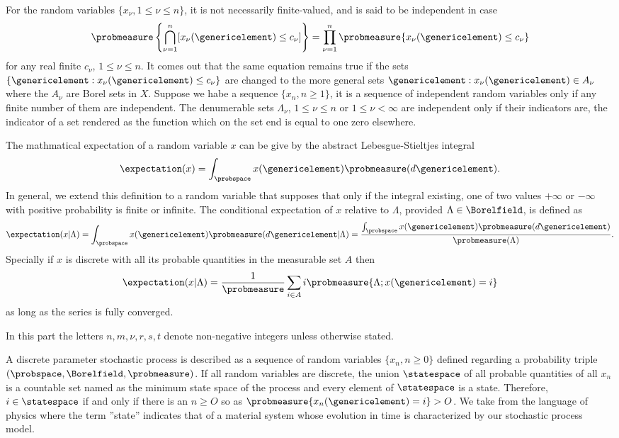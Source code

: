 For the random variables $\{x_\nu, 1\leq \nu \leq n\}$, it is not necessarily finite-valued, and is said to be independent in case
\begin{equation}
\probmeasure \left\{\bigcap_{\nu=1}^n [x_\nu(\genericelement)\leq c_\nu]\right\} = \prod_{\nu =1}^n \probmeasure\{x_\nu (\genericelement)\leq c_\nu\}
\end{equation}
for any real finite $c_\nu$, $1\leq \nu \leq n$. It comes out that the same equation remains true if the sets $\{\genericelement :x_\nu (\genericelement)\leq c_\nu\}$ are changed to the more general sets ${\genericelement :x_\nu(\genericelement)\in A_\nu}$ where the $A_\nu$ are Borel sets in $X$. Suppose we habe a sequence $\{x_n,n\geq 1\}$, it is a sequence of independent random variables only if any finite number of them are independent. The denumerable sets $\Lambda_\nu$, $1\leq \nu \leq n$ or $1\leq \nu < \infty$ are independent only if their indicators are, the indicator of a set rendered as the function which on the set end is equal to one zero elsewhere.

The mathmatical expectation of a random variable $x$ can be give by the abstract Lebesgue-Stieltjes integral
\begin{equation}
    \expectation(x) = \int_{\probspace} x(\genericelement) \probmeasure(d\genericelement).
\end{equation}
In general, we extend this definition to a random variable that supposes that only if the integral existing, one of two values $+\infty$ or $-\infty$ with positive probability is finite or infinite. The conditional expectation of $x$ relative to $\Lambda$, provided $\Lambda \in \Borelfield$, is defined as
\begin{equation}
    \expectation(x|\Lambda) = \int_{\probspace}x(\genericelement) \probmeasure(d\genericelement|\Lambda) = \frac{\int_{\probspace}x(\genericelement) \probmeasure(d\genericelement)}{\probmeasure(\Lambda)}.
\end{equation}
Specially if $x$ is discrete with all its probable quantities in the measurable set $A$ then
\begin{equation}
    \expectation(x|\Lambda)=\frac{1}{\probmeasure} \sum_{i\in A} i\probmeasure\{\Lambda; x(\genericelement)= i\}
\end{equation} 
as long as the series is fully converged.

In this part the letters $n, m, \nu, r ,s ,t $ denote non-negative integers unless otherwise stated.

A discrete parameter stochastic process is described as a sequence of random variables $\{x_n, n\geq 0\}$ defined regarding a probability triple $(\probspace, \Borelfield, \probmeasure)$. If all random variables are discrete, the union $\statespace$ of all probable quantities of all $x_n$ is a countable set named as the minimum state space of the process and every element of $\statespace$ is a state. Therefore, $i\in \statespace$ if and only if there is an $n \geq O$ so as $\probmeasure\{x_n(\genericelement) = i\} >  O$. We take from the language of physics where the term ''state'' indicates that of a  material system whose evolution in time is characterized by our stochastic process model.

